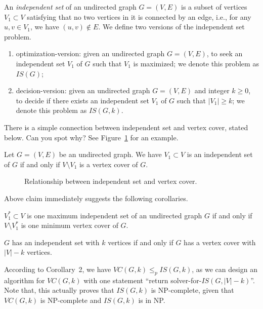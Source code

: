 An \emph{independent set} of an undirected graph $G = (V, E)$
is a subset of vertices $V_1\subset V$ satisfying that no two vertices in it is connected by an edge, i.e.,
for any $u,v\in V_1$, we have $(u,v)\not\in E$. We define two versions of the independent set problem.
\vspace*{-\topsep}
\begin{enumerate}
\item optimization-version: given an undirected graph $G = (V, E)$, to seek an independent set $V_1$ of $G$ such that $V_1$ is maximized; we denote this problem as $IS(G)$;
\item decision-version: given an undirected graph $G = (V, E)$ and integer $k\ge 0$, to decide if there exists an independent set $V_1$ of $G$ such that $|V_1| \ge k$;
we denote this problem as $IS(G,k)$.
\end{enumerate}

There is a simple connection between independent set and vertex cover, stated below. Can you spot why?
See Figure~\ref{fig:is} for an example.

\begin{claim}
Let $G = (V, E)$ be an undirected graph. We have $V_1\subset V$ is an independent set of $G$ if and only if $V\setminus V_1$ is a vertex cover of $G$.
\end{claim}

\begin{figure}[!h]
\centering{}
\caption{Relationship between independent set and vertex cover.}
\label{fig:is}
\end{figure}

Above claim immediately suggests the following corollaries.
\begin{corollary}
$V_1^*\subset V$ is one maximum independent set of an undirected graph $G$ if and only if $V\setminus V_1^*$ is one minimum vertex cover of $G$.
\end{corollary}
\begin{corollary}
$G$ has an independent set with $k$ vertices if and only if $G$ has a vertex cover with $|V|-k$ vertices.
\end{corollary}

According to Corollary~2, we have $VC(G, k) \le_p IS(G, k)$, as we can design an algorithm for $VC(G,k)$ with one statement ``return solver-for-$IS(G,|V|-k)$''.
Note that, this actually proves that $IS(G,k)$ is NP-complete, given that $VC(G,k)$ is NP-complete and $IS(G,k)$ is in NP.

